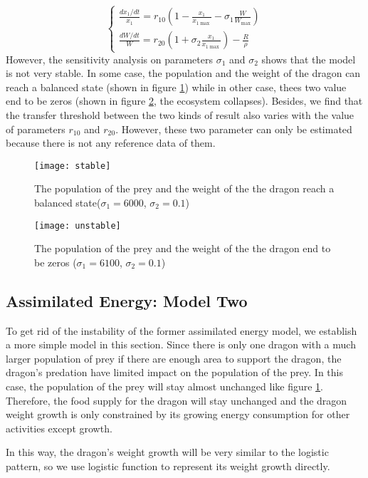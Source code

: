 \documentclass{mcmthesis}
\begin{document}
\begin{equation}
\left\{\begin{array}{ll}
\frac{dx_1/dt}{x_1}=r_{10}(1-\frac{x_1}{x_{1\max}}-\sigma_1\frac{W}{W_{\max}})\\
\frac{dW/dt}{W}=r_{20}(1+\sigma_2\frac{x_1}{x_{1\max}})-\frac{R}{\rho}
\end{array}\right.
\end{equation}
However, the sensitivity analysis on parameters $\sigma_1$ and $\sigma_2$ shows that the model is not very stable. In some case, the population and the weight of the dragon can reach a balanced state (shown in figure \ref{stable}) while in other case, thees two value end to be zeros (shown in figure \ref{unstable}, the ecosystem collapses). Besides, we find that the transfer threshold between the two kinds of result also varies with the value of parameters $r_{10}$ and $r_{20}$. However, these two parameter can only be estimated because there is not any reference data of them.
\begin{figure}[h]
\small
\centering
\texttt{[image: stable]}
\caption{The population of the prey and the weight of the the dragon reach a balanced state($\sigma_1=6000$, $\sigma_2=0.1$)}\label{stable}
\end{figure}

\begin{figure}[h]
\small
\centering
\texttt{[image: unstable]}
\caption{The population of the prey and the weight of the the dragon end to be zeros ($\sigma_1=6100$, $\sigma_2=0.1$)}\label{unstable}
\end{figure}

\subsection{Assimilated Energy: Model Two}
To get rid of the instability of the former assimilated energy model, we establish a more simple model in this section. Since there is only one dragon with a much larger population of prey if there are enough area to support the dragon, the dragon's predation have limited impact on the population of the prey. In this case, the population of the prey will stay almost unchanged like figure \ref{stable}. Therefore, the food supply for the dragon will stay unchanged and the dragon weight growth is only constrained by its growing energy consumption for other activities except growth.

In this way, the dragon's weight growth will be very similar to the logistic pattern, so we use logistic function to represent its weight growth directly.
\end{document}
